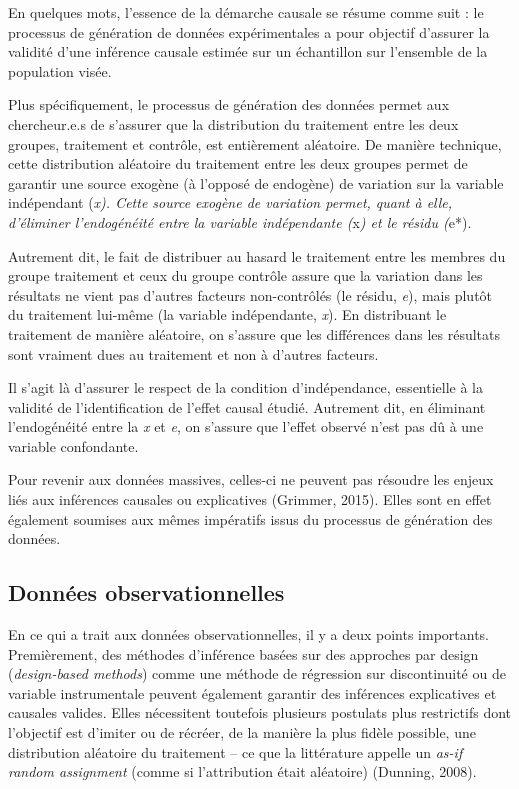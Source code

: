 \documentclass[
  letterpaper,
]{scrbook}
\begin{document}
En quelques mots, l'essence de la démarche causale se résume comme suit
: le processus de génération de données expérimentales a pour objectif
d'assurer la validité d'une inférence causale estimée sur un échantillon
sur l'ensemble de la population visée.

Plus spécifiquement, le processus de génération des données permet aux
chercheur.e.s de s'assurer que la distribution du traitement entre les
deux groupes, traitement et contrôle, est entièrement aléatoire. De
manière technique, cette distribution aléatoire du traitement entre les
deux groupes permet de garantir une source exogène (à l'opposé de
endogène) de variation sur la variable indépendant (\emph{x). Cette
source exogène de variation permet, quant à elle, d'éliminer
l'endogénéité entre la variable indépendante (}x\emph{) et le résidu
(}e*).

Autrement dit, le fait de distribuer au hasard le traitement entre les
membres du groupe traitement et ceux du groupe contrôle assure que la
variation dans les résultats ne vient pas d'autres facteurs
non-contrôlés (le résidu, \emph{e}), mais plutôt du traitement lui-même
(la variable indépendante, \emph{x}). En distribuant le traitement de
manière aléatoire, on s'assure que les différences dans les résultats
sont vraiment dues au traitement et non à d'autres facteurs.

Il s'agit là d'assurer le respect de la condition d'indépendance,
essentielle à la validité de l'identification de l'effet causal étudié.
Autrement dit, en éliminant l'endogénéité entre la \emph{x} et \emph{e},
on s'assure que l'effet observé n'est pas dû à une variable confondante.

Pour revenir aux données massives, celles-ci ne peuvent pas résoudre les
enjeux liés aux inférences causales ou explicatives (Grimmer, 2015).
Elles sont en effet également soumises aux mêmes impératifs issus du
processus de génération des données.

\hypertarget{donnuxe9es-observationnelles}{%
\subsection{Données
observationnelles}\label{donnuxe9es-observationnelles}}

En ce qui a trait aux données observationnelles, il y a deux points
importants. Premièrement, des méthodes d'inférence basées sur des
approches par design (\emph{design-based methods}) comme une méthode de
régression sur discontinuité ou de variable instrumentale peuvent
également garantir des inférences explicatives et causales valides.
Elles nécessitent toutefois plusieurs postulats plus restrictifs dont
l'objectif est d'imiter ou de récréer, de la manière la plus fidèle
possible, une distribution aléatoire du traitement -- ce que la
littérature appelle un \emph{as-if random assignment} (comme si
l'attribution était aléatoire) (Dunning, 2008).
\end{document}
